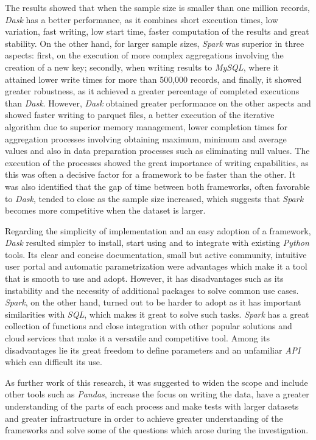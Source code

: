 \documentclass[11pt, oneside]{book}
\begin{document}
The results showed that when the sample size is smaller than one million records, \textit{Dask} has a better performance, as it combines short execution times, low variation, fast writing, low start time, faster computation of the results and great stability. On the other hand, for larger sample sizes, \textit{Spark} was superior in three aspects: first, on the execution of more complex aggregations involving the creation of a new key; secondly, when writing results to \textit{MySQL}, where it attained lower write times for more than 500,000 records, and finally, it showed greater robustness, as it achieved a greater percentage of completed executions than \textit{Dask}. However, \textit{Dask} obtained greater performance on the other aspects and showed faster writing to parquet files, a better execution of the iterative algorithm due to superior memory management, lower completion times for aggregation processes involving obtaining maximum, minimum and average values and also in data preparation processes such as eliminating null values. The execution of the processes showed the great importance of writing capabilities, as this was often a decisive factor for a framework to be faster than the other. It was also identified that the gap of time between both frameworks, often favorable to \textit{Dask}, tended to close as the sample size increased, which suggests that \textit{Spark} becomes more competitive when the dataset is larger. 

Regarding the simplicity of implementation and an easy adoption of a framework, \textit{Dask} resulted simpler to install, start using and to integrate with existing \textit{Python} tools. Its clear and concise documentation, small but active community, intuitive user portal and automatic parametrization were advantages which make it a tool that is smooth to use and adopt. However, it has disadvantages such as its instability and the necessity of additional packages to solve common use cases. \textit{Spark}, on the other hand, turned out to be harder to adopt as it has important similarities with \textit{SQL}, which makes it great to solve such tasks. \textit{Spark} has a  great collection of functions and close integration with other popular solutions and cloud services that make it a versatile and competitive tool. Among its disadvantages lie its great freedom to define parameters and an unfamiliar \textit{API} which can difficult its use.

As further work of this research, it was suggested to widen the scope and include other tools such as \textit{Pandas}, increase the focus on writing the data, have a greater understanding of the parts of each process and make tests with larger datasets and greater infrastructure in order to achieve greater understanding of the frameworks and solve some of the questions which arose during the investigation.
\end{document}
